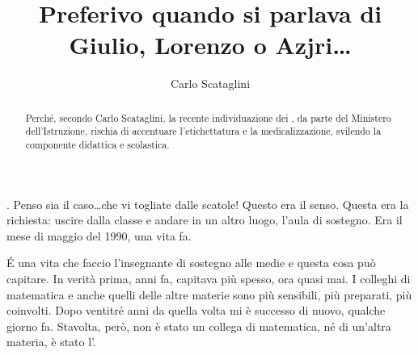 \author{Carlo Scataglini}
\title{Preferivo quando si parlava di Giulio, Lorenzo o Azjri\dots}
\label{cha:scataglini1}
\begin{abstract}
Perché, secondo Carlo Scataglini, la recente individuazione dei , da parte del Ministero dell'Istruzione, rischia di accentuare l'etichettatura e la medicalizzazione, svilendo la componente didattica e scolastica. 
\end{abstract}
\maketitle
{}
. Penso sia il caso\dots che vi togliate dalle scatole! Questo era il senso. Questa era la richiesta: uscire dalla classe e andare in un altro luogo, l'aula di sostegno. Era il mese di maggio del 1990, una vita fa.

\'E una vita che faccio l'insegnante di sostegno alle medie e questa cosa può capitare. In verità prima, anni fa, capitava più spesso, ora quasi mai. I colleghi di matematica e anche quelli delle altre materie sono più sensibili, più preparati, più coinvolti. Dopo ventitré anni da quella volta mi è successo di nuovo, qualche giorno fa. Stavolta, però, non è stato un collega di matematica, né di un'altra materia, è stato l'.

